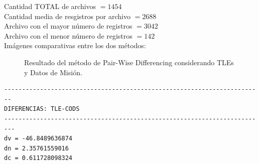 \noindent
Cantidad TOTAL de archivos $=  1454$\\
Cantidad media de resgistros por archivo $=  2688$\\
Archivo con el mayor n\'umero de registros $=  3042$\\
Archivo con el menor n\'umero de registros $=  142$\\

Im\'agenes comparativas entre los dos m\'etodos:\\

\begin{figure}[htbp]
 \centering
 \caption{Resultado del m\'etodo de Pair-Wise Differencing considerando TLEs y Datos de Misi\'on.}
 \label{fig:test}
\end{figure}

\begin{verbatim}
------------------------------------------------------------------------
DIFERENCIAS: TLE-CODS
-------------------------------------------------------------------------
dv = -46.8489636874
dn = 2.35761559016
dc = 0.611728098324
\end{verbatim}

